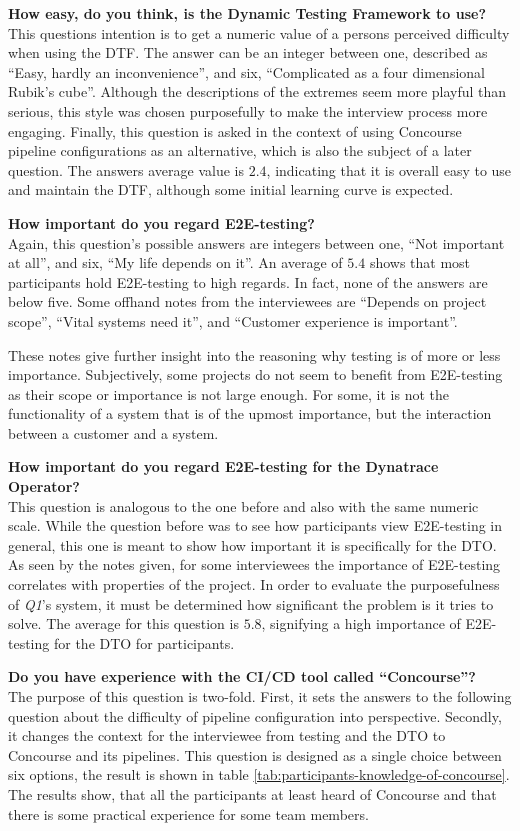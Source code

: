 \textbf{How easy, do you think, is the Dynamic Testing Framework to use?}\\
This questions intention is to get a numeric value of a persons perceived difficulty when using the DTF.
The answer can be an integer between one, described as ``Easy, hardly an inconvenience'', and six, ``Complicated as a four dimensional Rubik's cube''.
Although the descriptions of the extremes seem more playful than serious, this style was chosen purposefully to make the interview process more engaging.
Finally, this question is asked in the context of using Concourse pipeline configurations as an alternative, which is also the subject of a later question.
The answers average value is $2.4$, indicating that it is overall easy to use and maintain the DTF, although some initial learning curve is expected.

\textbf{How important do you regard E2E-testing?}\\
Again, this question's possible answers are integers between one, ``Not important at all'', and six, ``My life depends on it''.
An average of $5.4$ shows that most participants hold E2E-testing to high regards.
In fact, none of the answers are below five.
Some offhand notes from the interviewees are ``Depends on project scope'', ``Vital systems need it'', and ``Customer experience is important''.

These notes give further insight into the reasoning why testing is of more or less importance.
Subjectively, some projects do not seem to benefit from E2E-testing as their scope or importance is not large enough.
For some, it is not the functionality of a system that is of the upmost importance, but the interaction between a customer and a system.

\textbf{How important do you regard E2E-testing for the Dynatrace Operator?}\\
This question is analogous to the one before and also with the same numeric scale.
While the question before was to see how participants view E2E-testing in general, this one is meant to show how important it is specifically for the DTO.
As seen by the notes given, for some interviewees the importance of E2E-testing correlates with properties of the project.
In order to evaluate the purposefulness of \textit{Q1}'s system, it must be determined how significant the problem is it tries to solve.
The average for this question is $5.8$, signifying a high importance of E2E-testing for the DTO for participants.

\textbf{Do you have experience with the CI/CD tool called ``Concourse''?}\\
The purpose of this question is two-fold.
First, it sets the answers to the following question about the difficulty of pipeline configuration into perspective.
Secondly, it changes the context for the interviewee from testing and the DTO to Concourse and its pipelines.
This question is designed as a single choice between six options, the result is shown in table \ref{tab:participants-knowledge-of-concourse}.
The results show, that all the participants at least heard of Concourse and that there is some practical experience for some team members.

